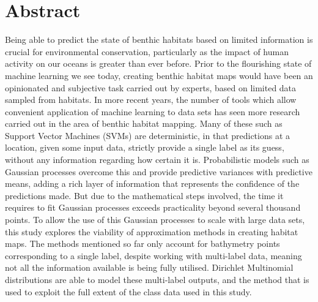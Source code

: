 \chapter*{Abstract}

Being able to predict the state of benthic habitats based on limited information is crucial for environmental conservation, particularly as the impact of human activity on our oceans is greater than ever before. Prior to the flourishing state of machine learning we see today, creating benthic habitat maps would have been an opinionated and subjective task carried out by experts, based on limited data sampled from habitats. In more recent years, the number of tools which allow convenient application of machine learning to data sets has seen more research carried out in the area of benthic habitat mapping. Many of these such as Support Vector Machines (SVMs) are deterministic, in that predictions at a location, given some input data, strictly provide a single label as its guess, without any information regarding how certain it is. Probabilistic models such as Gaussian processes overcome this and provide predictive variances with predictive means, adding a rich layer of information that represents the confidence of the predictions made. But due to the mathematical steps involved, the time it requires to fit Gaussian processes exceeds practicality beyond several thousand points. To allow the use of this Gaussian processes to scale with large data sets, this study explores the viability of approximation methods in creating habitat maps. The methods mentioned so far only account for bathymetry points corresponding to a single label, despite working with multi-label data, meaning not all the information available is being fully utilised. Dirichlet Multinomial distributions are able to model these multi-label outputs, and the method that is used to exploit the full extent of the class data used in this study.

